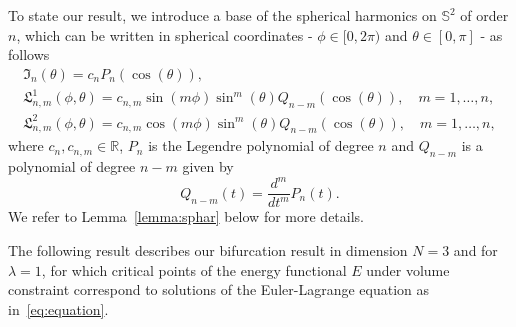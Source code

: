 \documentclass[10pt,reqno,english]{amsart}
\newcommand{\Sd}{\mathbb{S}^2}
\newcommand{\R} {\mathbb R}
\theoremstyle{definition}
\numberwithin{equation}{section}
\begin{document}
To state our result, we introduce 
 a base of the spherical harmonics on $\Sd$ of order $n$, which can be written in spherical coordinates - $\phi\in[0,2\pi)$ and $\theta\in[0,\pi]$ - as follows
\begin{equation}
\label{harm-3d}
\begin{gathered}
\mathfrak I_n(\theta)=c_n P_n(\cos(\theta)),\\
\mathfrak L^1_{n,m}(\phi,\theta)=c_{n,m}\sin(m\phi)\sin^m(\theta)Q_{n-m}(\cos(\theta)),\quad m=1,\dots,n,\\
\mathfrak L^2_{n,m}(\phi,\theta)=c_{n,m}\cos(m\phi)\sin^m(\theta)Q_{n-m}(\cos(\theta)),\quad m=1,\dots,n,
\end{gathered}
\end{equation}
where $c_n,c_{n,m}\in\R$, $P_{n}$ is the Legendre polynomial of degree $n$ and $Q_{n-m}$ is a polynomial of degree $n-m$ given by
\[
Q_{n-m}(t)=\frac{d^m}{dt^m}P_n(t).
\]
We refer to Lemma~\ref{lemma:sphar} below for more details.


The following result describes   our bifurcation result in dimension $N=3$ and for $\lambda =1$, for which critical points of the energy functional $E$ under volume constraint correspond to solutions of the Euler-Lagrange equation as in~\eqref{eq:equation}.
\end{document}
